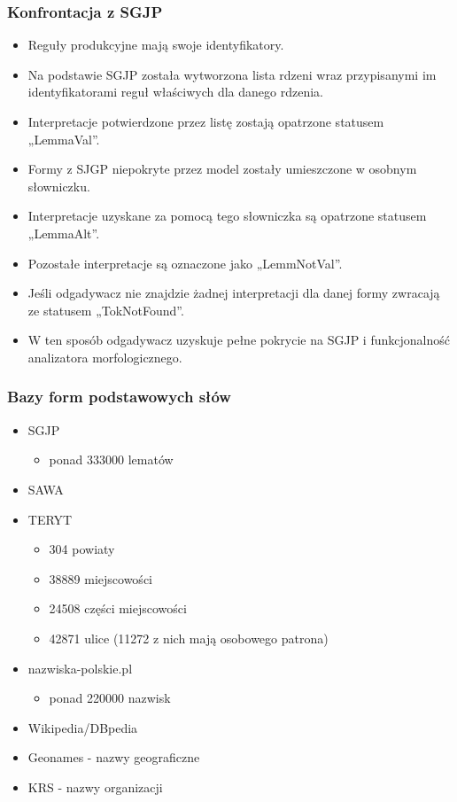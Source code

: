 \documentclass{beamer}
\begin{document}
\begin{frame}
\frametitle{Konfrontacja z SGJP}
\begin{itemize}
\item Reguły produkcyjne mają swoje identyfikatory. 
\item Na podstawie SGJP została wytworzona lista rdzeni wraz przypisanymi im identyfikatorami reguł właściwych dla danego rdzenia.
\item Interpretacje potwierdzone przez listę zostają opatrzone statusem „LemmaVal”.
\item Formy z SJGP niepokryte przez model zostały umieszczone w osobnym słowniczku.
\item Interpretacje uzyskane za pomocą tego słowniczka są opatrzone statusem „LemmaAlt”.
\item Pozostałe interpretacje są oznaczone jako „LemmNotVal”.
\item Jeśli odgadywacz nie znajdzie żadnej interpretacji dla danej formy zwracają ze statusem „TokNotFound”.
\item W ten sposób odgadywacz uzyskuje pełne pokrycie na SGJP i funkcjonalność analizatora morfologicznego.
\end{itemize}
\end{frame}

\begin{frame}
\frametitle{Bazy form podstawowych słów}
\begin{itemize}
\item SGJP
\begin{itemize}
\item  ponad 333000 lematów
\end{itemize}
\item SAWA
\item TERYT
\begin{itemize}
\item 304 powiaty
\item 38889 miejscowości
\item 24508 części miejscowości 
\item 42871 ulice (11272 z nich mają osobowego patrona)
\end{itemize}
\item nazwiska-polskie.pl
\begin{itemize}
\item ponad 220000 nazwisk
\end{itemize}
\item Wikipedia/DBpedia
\item Geonames - nazwy geograficzne
\item KRS - nazwy organizacji
\end{itemize}
\end{frame}
\end{document}
